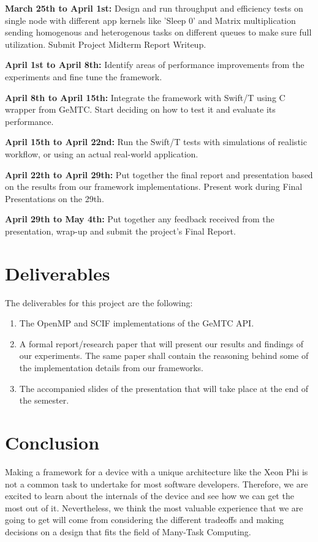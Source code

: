 \documentclass[10pt, conference, compsocconf]{IEEEtran}
\begin{document}
\textbf{March 25th to April 1st:} Design and run throughput and efficiency tests on single node with different app kernels like 'Sleep 0' and Matrix multiplication sending homogenous and heterogenous tasks on different queues to make sure full utilization. Submit Project Midterm Report Writeup.

\textbf{April 1st to April 8th:} Identify areas of performance improvements from the experiments and fine tune the framework.

\textbf{April 8th to April 15th:} Integrate the framework with Swift/T using C wrapper from GeMTC. Start deciding on how to test it and evaluate its performance.

\textbf{April 15th to April 22nd:} Run the Swift/T tests with simulations of realistic workflow, or using an actual real-world application.

\textbf{April 22th to April 29th:} Put together the final report and presentation based on the results from our framework implementations. Present work during Final Presentations on the 29th.

\textbf{April 29th to May 4th:} Put together any feedback received from the presentation, wrap-up and submit the project's Final Report.

\newpage

\section{Deliverables}

The deliverables for this project are the following:\\

\begin{enumerate}
  \item The OpenMP and SCIF implementations of the GeMTC API.
  \item A formal report/research paper that will present our results and findings of our experiments. The same paper shall contain the reasoning behind some of the implementation details from our frameworks.
  \item The accompanied slides of the presentation that will take place at the end of the semester.
\end{enumerate}

\section{Conclusion}
Making a framework for a device with a unique architecture like the Xeon Phi is not a common task to undertake for most software developers. Therefore, we are excited to learn about the internals of the device and see how we can get the most out of it. Nevertheless, we think the most valuable experience that we are going to get will come from considering the different tradeoffs and making decisions on a design that fits the field of Many-Task Computing.
\end{document}
